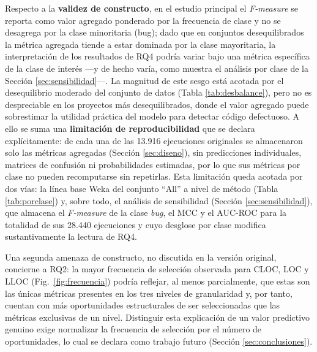 \documentclass[conference,a4paper]{IEEEtran}
\begin{document}
Respecto a la \textbf{validez de constructo}, en el estudio principal el \textit{F-measure} se reporta como valor agregado ponderado por la frecuencia de clase y no se desagrega por la clase minoritaria (bug); dado que en conjuntos desequilibrados la métrica agregada tiende a estar dominada por la clase mayoritaria, la interpretación de los resultados de RQ4 podría variar bajo una métrica específica de la clase de interés ---y de hecho varía, como muestra el análisis por clase de la Sección \ref{sec:sensibilidad}---. La magnitud de este sesgo está acotada por el desequilibrio moderado del conjunto de datos (Tabla \ref{tab:desbalance}), pero no es despreciable en los proyectos más desequilibrados, donde el valor agregado puede sobrestimar la utilidad práctica del modelo para detectar código defectuoso. A ello se suma una \textbf{limitación de reproducibilidad} que se declara explícitamente: de cada una de las 13.916 ejecuciones originales se almacenaron solo las métricas agregadas (Sección \ref{sec:diseno}), sin predicciones individuales, matrices de confusión ni probabilidades estimadas, por lo que sus métricas por clase no pueden recomputarse sin repetirlas. Esta limitación queda acotada por dos vías: la línea base Weka del conjunto ``All'' a nivel de método (Tabla \ref{tab:porclase}) y, sobre todo, el análisis de sensibilidad (Sección \ref{sec:sensibilidad}), que almacena el \textit{F-measure} de la clase \textit{bug}, el MCC y el AUC-ROC para la totalidad de sus 28.440 ejecuciones y cuyo desglose por clase modifica sustantivamente la lectura de RQ4.

Una segunda amenaza de constructo, no discutida en la versión original, concierne a RQ2: la mayor frecuencia de selección observada para CLOC, LOC y LLOC (Fig.~\ref{fig:frecuencia}) podría reflejar, al menos parcialmente, que estas son las únicas métricas presentes en los tres niveles de granularidad y, por tanto, cuentan con más oportunidades estructurales de ser seleccionadas que las métricas exclusivas de un nivel. Distinguir esta explicación de un valor predictivo genuino exige normalizar la frecuencia de selección por el número de oportunidades, lo cual se declara como trabajo futuro (Sección \ref{sec:conclusiones}).
\end{document}
